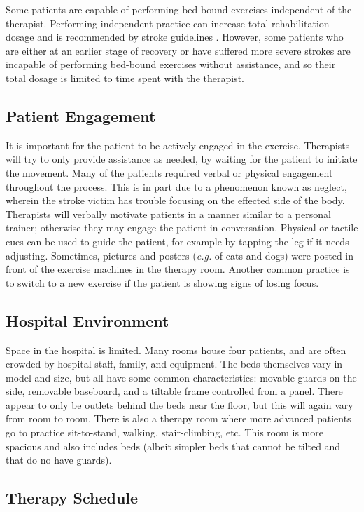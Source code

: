 \documentclass[12pt]{report}
\begin{document}
	Some patients are capable of performing bed-bound exercises independent of the therapist. Performing independent practice can increase total rehabilitation dosage and is recommended by stroke guidelines \cite{Hebert2016}. However, some patients who are either at an earlier stage of recovery or have suffered more severe strokes are incapable of performing bed-bound exercises without assistance, and so their total dosage is limited to time spent with the therapist. 
	
	\subsection{Patient Engagement} 
	 It is important for the patient to be actively engaged in the exercise. Therapists will try to only provide assistance as needed, by waiting for the patient to initiate the movement. Many of the patients required verbal or physical engagement throughout the process. This is in part due to a phenomenon known as neglect, wherein the stroke victim has trouble focusing on the effected side of the body. Therapists will verbally motivate patients in a manner similar to a personal trainer; otherwise they may engage the patient in conversation. Physical or tactile cues can be used to guide the patient, for example by tapping the leg if it needs adjusting. Sometimes, pictures and posters (\textit{e.g.} of cats and dogs) were posted in front of the exercise machines in the therapy room. Another common practice is to switch to a new exercise if the patient is showing signs of losing focus. 
	 
	 \subsection{Hospital Environment}
	Space in the hospital is limited. Many rooms house four patients, and are often crowded by hospital staff, family, and equipment. The beds themselves vary in model and size, but all have some common characteristics: movable guards on the side, removable baseboard, and a tiltable frame controlled from a panel. There appear to only be outlets behind the beds near the floor, but this will again vary from room to room. 
	There is also a therapy room where more advanced patients go to practice sit-to-stand, walking, stair-climbing, etc. This room is more spacious and also includes beds (albeit simpler beds that cannot be tilted and that do no have guards). 
	
	\subsection{Therapy Schedule}
	
\end{document}
